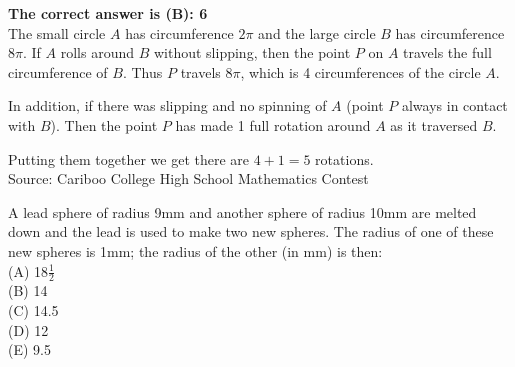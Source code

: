 \documentclass{article}
\begin{document}
\textbf{The correct answer is (B): 6}\\[1 ex]
The small circle $A$ has circumference $2\pi$ and the large circle $B$ has circumference $8\pi$. If $A$ rolls around $B$ without slipping, then the point $P$ on $A$ travels the full circumference of $B$. Thus $P$ travels $8\pi$, which is 4 circumferences of the circle $A$.

In addition, if there was slipping and no spinning of $A$ (point $P$ always in contact with $B$). Then the point $P$ has made 1 full rotation around $A$ as it traversed $B$.

Putting them together we get there are $4+1=5$ rotations.
\\[5 ex]

\scriptsize
Source: Cariboo College High School Mathematics Contest

\normalsize
A lead sphere of radius 9mm and another sphere of radius 10mm are melted down and the lead is used to make two new spheres. The radius of one of these new spheres is 1mm; the radius of the other (in mm) is then:\\
(A) 18$\frac{1}{2}$\\
(B) 14\\
(C) 14.5\\
(D) 12\\
(E) 9.5\\

\end{document}
